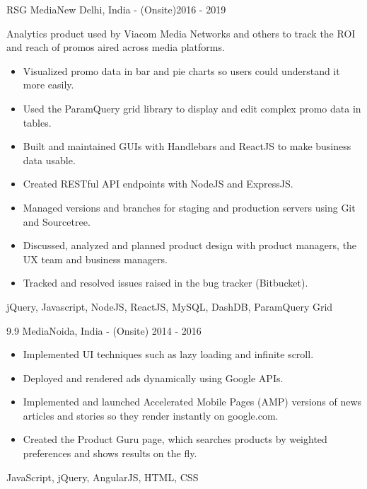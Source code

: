 \begin{projects}
    \project
    {RSG Media}{New Delhi, India - (Onsite)}{2016 - 2019}
    {}
    {Analytics product used by Viacom Media Networks and others to track the ROI and reach of promos aired across media platforms.
    \begin{itemize}
        \item Visualized promo data in bar and pie charts so users could understand it more easily.
        \item Used the ParamQuery grid library to display and edit complex promo data in tables.
        \item Built and maintained GUIs with Handlebars and ReactJS to make business data usable.
        \item Created RESTful API endpoints with NodeJS and ExpressJS.
        \item Managed versions and branches for staging and production servers using Git and Sourcetree.
        \item Discussed, analyzed and planned product design with product managers, the UX team and business managers.
        \item Tracked and resolved issues raised in the bug tracker (Bitbucket).
    \end{itemize}}
    {jQuery, Javascript, NodeJS, ReactJS, MySQL, DashDB, ParamQuery Grid}

    \project
    {9.9 Media}{Noida, India - (Onsite)} {2014 - 2016}
    {}
    {\begin{itemize}
        \item Implemented UI techniques such as lazy loading and infinite scroll.
        \item Deployed and rendered ads dynamically using Google APIs.
        \item Implemented and launched Accelerated Mobile Pages (AMP) versions of news articles and stories so they render instantly on google.com.
        \item Created the Product Guru page, which searches products by weighted preferences and shows results on the fly.
    \end{itemize}}
    {JavaScript, jQuery, AngularJS, HTML, CSS}
    

\end{projects}
